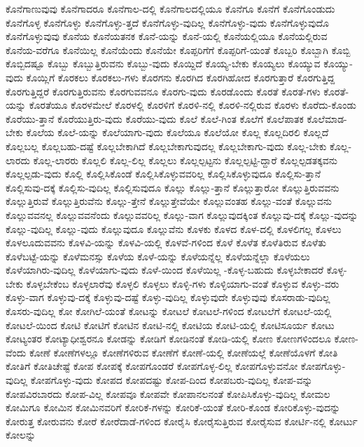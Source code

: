 {ಕೊನೆಗಾಣುವುವು
ಕೊನೆಗಾದರೂ
ಕೊನೆಗಾಲ-ದಲ್ಲಿ
ಕೊನೆಗಾಲದಲ್ಲಿಯೂ
ಕೊನೆಗೂ
ಕೊನೆಗೆ
ಕೊನೆಗೊಂಡುದು
ಕೊನೆಗೊಳ್ಳ
ಕೊನೆಗೊಳ್ಳು
ಕೊನೆಗೊಳ್ಳು-ತ್ತದೆ
ಕೊನೆಗೊಳ್ಳು-ವುದಿಲ್ಲ
ಕೊನೆಗೊಳ್ಳು-ವುದು
ಕೊನೆಗೊಳ್ಳುವುದೊ
ಕೊನೆಗೊಳ್ಳುವುವು
ಕೊನೆಯ
ಕೊನೆಯತನಕ
ಕೊನೆ-ಯನ್ನು
ಕೊನೆ-ಯಲ್ಲಿ
ಕೊನೆಯಲ್ಲಿಯೂ
ಕೊನೆಯಲ್ಲಿರುವ
ಕೊನೆಯ-ವರೆಗೂ
ಕೊನೆಯಿಲ್ಲ
ಕೊನೆಯೆಂದು
ಕೊನೆಯೇ
ಕೊಪ್ಪರಿಗೆಗೆ
ಕೊಪ್ಪರಿಗೆ-ಯಂತೆ
ಕೊಬ್ಬರಿ
ಕೊಬ್ಬಾಗಿ
ಕೊಬ್ಬಿ
ಕೊಬ್ಬಿದಷ್ಟೂ
ಕೊಬ್ಬು
ಕೊಬ್ಬುತ್ತಿರುವನು
ಕೊಬ್ಬು-ವುದು
ಕೊಯ್ದಿದೆ
ಕೊಯ್ಯ-ಬೇಕು
ಕೊಯ್ಯಲು
ಕೊಯ್ಯುವ
ಕೊಯ್ಯು-ವುದು
ಕೊಯ್ಲಿಗೆ
ಕೊರಕಲು
ಕೊರಕಲು-ಗಳು
ಕೊರಗನು
ಕೊರಗಿದ
ಕೊರಗಿಹೋದ
ಕೊರಗುತ್ತಾರೆ
ಕೊರಗುತ್ತಿದ್ದ
ಕೊರಗುತ್ತಿದ್ದರೆ
ಕೊರಗುತ್ತಿರುವನು
ಕೊರಗುವವನೂ
ಕೊರಗು-ವುದು
ಕೊರಡೊಂದು
ಕೊರತೆ
ಕೊರತೆ-ಗಳು
ಕೊರತೆ-ಯನ್ನು
ಕೊರತೆಯೂ
ಕೊರಳಮೇಲೆ
ಕೊರಳಲ್ಲಿ
ಕೊರಳಿಗೆ
ಕೊರಳಿ-ನಲ್ಲಿ
ಕೊರಳಿ-ನಲ್ಲಿರುವ
ಕೊರಳು
ಕೊರೆದು-ಕೊಂಡು
ಕೊರೆಯು-ತ್ತಾನೆ
ಕೊರೆಯುತ್ತಿರು-ವುದು
ಕೊರೆಯು-ವುದು
ಕೊಲೆ
ಕೊಲೆ-ಗಿಂತ
ಕೊಲೆಗೆ
ಕೊಲೆಪಾತಕ
ಕೊಲೆಮಾಡ-ಬೇಕು
ಕೊಲೆಯ
ಕೊಲೆ-ಯನ್ನು
ಕೊಲೆಯಾಗು-ವುದು
ಕೊಲೆಯೂ
ಕೊಲೆಯೋ
ಕೊಲ್ಲ
ಕೊಲ್ಲದಿರಲಿ
ಕೊಲ್ಲದೆ
ಕೊಲ್ಲಬಲ್ಲ
ಕೊಲ್ಲಬಹು-ದಷ್ಟೆ
ಕೊಲ್ಲಬೇಕಾಗಿದೆ
ಕೊಲ್ಲಬೇಕಾಗುವುದಲ್ಲ
ಕೊಲ್ಲಬೇಕಾಗು-ವುದು
ಕೊಲ್ಲ-ಬೇಕು
ಕೊಲ್ಲ-ಲಾರದು
ಕೊಲ್ಲ-ಲಾರರು
ಕೊಲ್ಲಲಿ
ಕೊಲ್ಲ-ಲಿಲ್ಲ
ಕೊಲ್ಲಲು
ಕೊಲ್ಲಲ್ಪಟ್ಟನು
ಕೊಲ್ಲಲ್ಪಟ್ಟಿ-ದ್ದಾರೆ
ಕೊಲ್ಲಲ್ಪಡತಕ್ಕವನು
ಕೊಲ್ಲಲ್ಪಡು-ವುದು
ಕೊಲ್ಲಿ
ಕೊಲ್ಲಿಸಿಕೊಂಡೆ
ಕೊಲ್ಲಿಸಿಕೊಳ್ಳುವವರಿಲ್ಲ
ಕೊಲ್ಲಿಸಿಕೊಳ್ಳುವುದೂ
ಕೊಲ್ಲಿಸು-ತ್ತಾನೆ
ಕೊಲ್ಲಿಸುವು-ದಕ್ಕೆ
ಕೊಲ್ಲಿಸು-ವುದಿಲ್ಲ
ಕೊಲ್ಲಿಸುವುದೂ
ಕೊಲ್ಲು
ಕೊಲ್ಲು-ತ್ತಾನೆ
ಕೊಲ್ಲುತ್ತಾರೋ
ಕೊಲ್ಲುತ್ತಿರುವವನು
ಕೊಲ್ಲುತ್ತಿರುವೆ
ಕೊಲ್ಲುತ್ತಿರುವೆನು
ಕೊಲ್ಲು-ತ್ತೇನೆ
ಕೊಲ್ಲುತ್ತೇವೆಯೇ
ಕೊಲ್ಲುವಂತಹ
ಕೊಲ್ಲು-ವಂತೆ
ಕೊಲ್ಲುವನು
ಕೊಲ್ಲುವವನಲ್ಲ
ಕೊಲ್ಲುವವನೆಂದು
ಕೊಲ್ಲುವವರಿಲ್ಲ
ಕೊಲ್ಲು-ವಾಗ
ಕೊಲ್ಲುವುದಕ್ಕಿಂತ
ಕೊಲ್ಲುವು-ದಕ್ಕೆ
ಕೊಲ್ಲು-ವುದನ್ನು
ಕೊಲ್ಲು-ವುದಿಲ್ಲ
ಕೊಲ್ಲು-ವುದು
ಕೊಲ್ಲುವುದೂ
ಕೊಲ್ಲುವೆನು
ಕೊಳಕು
ಕೊಳದ
ಕೊಳ-ದಲ್ಲಿ
ಕೊಳಲಿಗಲ್ಲ
ಕೊಳಲು
ಕೊಳಲೂದುವವನು
ಕೊಳವಿ-ಯನ್ನು
ಕೊಳವಿ-ಯಲ್ಲಿ
ಕೊಳವೆ-ಗಳಿಂದ
ಕೊಳೆ
ಕೊಳೆತ
ಕೊಳೆತಿರುವ
ಕೊಳೆತು
ಕೊಳೆಬಟ್ಟೆ-ಯನ್ನು
ಕೊಳೆಮನಸ್ಸು
ಕೊಳೆಯ
ಕೊಳೆ-ಯನ್ನು
ಕೊಳೆಯನ್ನೆಲ್ಲ
ಕೊಳೆಯನ್ನೆಲ್ಲಾ
ಕೊಳೆಯಲು
ಕೊಳೆಯಾಗಿರು-ವುದಿಲ್ಲ
ಕೊಳೆಯಾಗು-ವುದು
ಕೊಳೆ-ಯಿಂದ
ಕೊಳೆಯಿಲ್ಲ
-ಕೊಳ್ಳ-ಬಹುದು
ಕೊಳ್ಳಬೇಕಾದರೆ
ಕೊಳ್ಳ-ಬೇಕು
ಕೊಳ್ಳಬೇಕೆಂಬ
ಕೊಳ್ಳಲಾರೆವು
ಕೊಳ್ಳಲಿ
ಕೊಳ್ಳಲು
ಕೊಳ್ಳಿ-ಗಳು
ಕೊಳ್ಳಿಯಾಗು-ವಂತೆ
ಕೊಳ್ಳುವ
ಕೊಳ್ಳು-ವರು
ಕೊಳ್ಳು-ವಾಗ
ಕೊಳ್ಳುವು-ದಕ್ಕೆ
ಕೊಳ್ಳುವು-ದಷ್ಟೆ
ಕೊಳ್ಳು-ವುದಿಲ್ಲ
ಕೊಳ್ಳುವುದೇ
ಕೊಳ್ಳುವುವು
ಕೊಸರಾಡು-ವುದಿಲ್ಲ
ಕೊಸರು-ವುದಿಲ್ಲ
ಕೋ
ಕೋಗಿಲೆ-ಯಂತೆ
ಕೋಟನ್ನು
ಕೋಟಲೆ
ಕೋಟಲೆ-ಗಳಿಂದ
ಕೋಟಲೆಗೆ
ಕೋಟಲೆ-ಯಲ್ಲಿ
ಕೋಟಲೆ-ಯಿಂದ
ಕೋಟಿ
ಕೋಟಿಗೆ
ಕೋಟಿನ
ಕೋಟಿ-ನಲ್ಲಿ
ಕೋಟಿಯ
ಕೋಟಿ-ಯಲ್ಲಿ
ಕೋಟಿಸೂರ್ಯ
ಕೋಟು
ಕೋಟ್ಯಂತರ
ಕೋಟ್ಯಾಧೀಶ್ವರನೂ
ಕೋಡನ್ನು
ಕೋಡಿಗೆ
ಕೋಡಿನಂತೆ
ಕೋಡಿ-ಯಲ್ಲಿ
ಕೋಣ
ಕೋಣಗಳಿಂದಲೂ
ಕೋಣ-ವೆಂದು
ಕೋಣೆ
ಕೋಣೆಗಳಲ್ಲೂ
ಕೋಣೆಗಳಿರುವ
ಕೋಣೆಗೆ
ಕೋಣೆ-ಯಲ್ಲಿ
ಕೋಣೆಯಲ್ಲೆ
ಕೋಣೆಯೊಳಗೆ
ಕೋತಿ
ಕೋತಿಗೆ
ಕೋತಿಚೇಷ್ಟೆ
ಕೋಪ
ಕೋಪಕ್ಕೆ
ಕೋಪಗೊಂಡರೆ
ಕೋಪಗೊಳ್ಳ-ಲಿಲ್ಲ
ಕೋಪಗೊಳ್ಳುವನೋ
ಕೋಪಗೊಳ್ಳು-ವುದಿಲ್ಲ
ಕೋಪಗೊಳ್ಳು-ವುದು
ಕೋಪದ
ಕೋಪದಷ್ಟು
ಕೋಪ-ದಿಂದ
ಕೋಪಬರು-ವುದಿಲ್ಲ
ಕೋಪ-ವನ್ನು
ಕೋಪವಿರಬಾರದು
ಕೋಪ-ವಿಲ್ಲ
ಕೋಪವೂ
ಕೋಪವೇ
ಕೋಪಾನಲನಂತೆ
ಕೋಪಿಸಿಕೊಳ್ಳು-ವುದಿಲ್ಲ
ಕೋಮಲ
ಕೋಮಿಗೂ
ಕೋಮಿನ
ಕೋಮಿನವರಿಗೆ
ಕೋರಿಕೆ-ಗಳನ್ನು
ಕೋರಿಕೆ-ಯಂತೆ
ಕೋರಿ-ಕೊಂಡ
ಕೋರಿಕೊಳ್ಳು-ವುದನ್ನು
ಕೋರುತ್ತ
ಕೋರುವನು
ಕೋರೆ
ಕೋರೆದಾಡೆ-ಗಳಿಂದ
ಕೋರೈಸಿ
ಕೋರೈಸುತ್ತಿರುವ
ಕೋರೈಸುವ
ಕೋರ್ಟಿ-ನಲ್ಲಿ
ಕೋರ್ಟು
ಕೋಲನ್ನು
}

